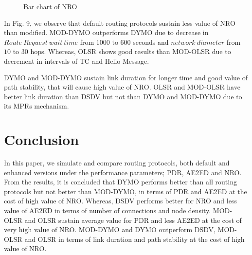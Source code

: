 \documentclass[journal]{IEEEtran}
\begin{document}
\begin{figure}[h]
  \centering
 \caption{Bar chart of NRO}
\end{figure}

In Fig. 9, we observe that default routing protocols sustain less value of NRO than modified. MOD-DYMO outperforms DYMO due to decrease in $Route~Request~wait~time$ from $1000$ to $600$ seconds and $network~diameter$ from $10$ to $30$ hops. Whereas, OLSR shows good results than MOD-OLSR due to decrement in intervals of TC and Hello Message.

DYMO and MOD-DYMO sustain link duration for longer time and good value of path stability, that will cause high value of NRO. OLSR and MOD-OLSR have better link duration than DSDV but not than DYMO and MOD-DYMO due to its MPRs mechanism.

\section{Conclusion}
In this paper, we simulate and compare routing protocols, both default and enhanced versions under the performance parameters; PDR, AE2ED and NRO. From the results, it is concluded that DYMO performs better than all routing protocols but not better than MOD-DYMO, in terms of PDR and AE2ED at the cost of high value of NRO. Whereas, DSDV performs better for NRO and less value of AE2ED in terms of number of connections and node density. MOD-OLSR and OLSR sustain average value for PDR and less AE2ED at the cost of very high value of NRO. MOD-DYMO and DYMO outperform DSDV, MOD-OLSR and OLSR in terms of link duration and path stability at the cost of high value of NRO.
\end{document}
